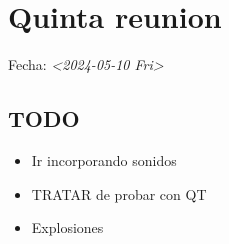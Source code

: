 \documentclass[11pt]{article}
\date{\today}
\title{}
\begin{document}
\tableofcontents

\section{Quinta reunion}
\label{sec:org71bdc18}
Fecha: \textit{<2024-05-10 Fri>}

\subsection{TODO}
\label{sec:org78e8d5c}
\begin{itemize}
\item Ir incorporando sonidos
\item TRATAR de probar con QT
\item Explosiones
\end{itemize}
\end{document}
